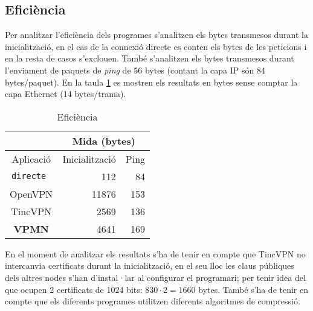 \subsection{Eficiència}
Per analitzar l'eficiència dels programes s'analitzen els bytes transmesos durant la inicialització, en el cas de la connexió directe es conten els bytes de les peticions  i en la resta de casos s'exclouen.
També s'analitzen els bytes transmesos durant l'enviament de paquets de \emph{ping} de 56 bytes (contant la capa IP són 84 bytes/paquet).
En la taula \ref{T:efi} es mostren els resultats en bytes sense comptar la capa Ethernet (14 bytes/trama).
\begin{table}[htb]
\begin{center}
\begin{tabular}{|c|r|r|}
\multicolumn{1}{c}{} & \multicolumn{2}{|c|}{Mida (bytes)} \\ \hline
Aplicació & Inicialització & Ping \\ \hline \hline
\tt directe & 112 & 84 \\ \hline
OpenVPN & 11876 & 153 \\ \hline
TincVPN & 2569 & 136 \\ \hline
\bf VPMN & 4641 & 169 \\ \hline
\end{tabular}
\end{center}
\begin{center}
\caption{Eficiència}
\label{T:efi}
\end{center}
\end{table}

En el moment de analitzar els resultats s'ha de tenir en compte que TincVPN no intercanvia certificats durant la inicialització, en el seu lloc les claus públiques dels altres nodes s'han d'instal·lar al configurar el programari; per tenir idea del que ocupen 2 certificats de 1024 bits: $830\cdot2=1660$ bytes.
També s'ha de tenir en compte que els diferents programes utilitzen diferents algoritmes de compressió. 

